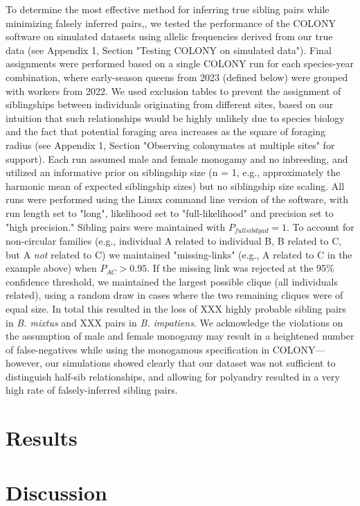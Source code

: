 \documentclass[12pt]{article}
\begin{document}
To determine the most effective method for inferring true sibling pairs while minimizing falsely inferred pairs,, we tested the performance of the COLONY software on simulated datasets using allelic frequencies derived from our true data (see Appendix 1, Section "Testing COLONY on simulated data"). Final assignments were performed based on a single COLONY run for each species-year combination, where early-season queens from 2023 (defined below) were grouped with workers from 2022. We used exclusion tables to prevent the assignment of siblingships between individuals originating from different sites, based on our intuition that such relationships would be highly unlikely due to species biology and the fact that potential foraging area increases as the square of foraging radius (see Appendix 1, Section "Observing colonymates at multiple sites" for support). Each run assumed male and female monogamy and no inbreeding, and utilized an informative prior on siblingship size (n = 1, e.g., approximately the harmonic mean of expected siblingship sizes) but no siblingship size scaling. All runs were performed using the Linux command line version of the software, with run length set to "long", likelihood set to "full-likelihood" and precision set to "high precision." Sibling pairs were maintained with $P_{fullsib dyad} = 1$. To account for non-circular families (e.g., individual A related to individual B, B related to C, but A \emph{not} related to C) we maintained "missing-links" (e.g., A related to C in the example above) when $P_{AC} > 0.95$. If the missing link was rejected at the 95\% confidence threshold, we maintained the largest possible clique (all individuals related), using a random draw in cases where the two remaining cliques were of equal size. In total this resulted in the loss of XXX highly probable sibling pairs in \emph{B. mixtus} and XXX pairs in \emph{B. impatiens}. We acknowledge the violations on the assumption of male and female monogamy may result in a heightened number of false-negatives while using the monogamous specification in COLONY---however, our simulations showed clearly that our dataset was not sufficient to distinguish half-sib relationships, and allowing for polyandry resulted in a very high rate of falsely-inferred sibling pairs.



\section{Results}
\section{Discussion}
\end{document}
